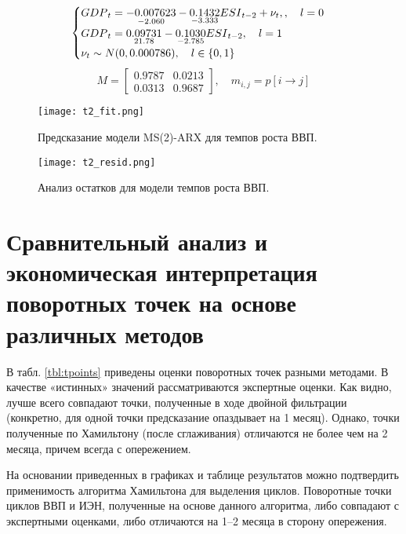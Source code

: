 \documentclass[../report.tex]{subfiles}
\begin{document}
	
	{
	\begin{equation}
		\label{eq:ms2varx}
		\begin{cases}
			{GDP}_{t} = 
				\underset{-2.060}{-0.007623} 
				- \underset{-3.333}{0.1432} {ESI}_{t-2}
				+ \nu_{t} , \space 
				, \quad l=0 \\
			{GDP}_{t} = 
				\underset{21.78}{0.09731}
				- \underset{-2.785}{0.1030} {ESI}_{t-2}
				, \quad l=1 \\
			\nu_{t} \sim N(0, 0.000786) , \quad l \in \{0, 1\}
		\end{cases}	
	\end{equation}
	\begin{equation}
		\label{eq:ms2varx_m}
		M = 
			\begin{bmatrix}
			0.9787 & 0.0213 \\
			0.0313 & 0.9687
			\end{bmatrix}
		, \quad m_{i,j} = p[i \rightarrow j]
	\end{equation}		
	}
		
	{
		\begin{figure}
			\texttt{[image: t2\_fit.png]}
			\caption{Предсказание модели MS(2)-ARX для темпов роста ВВП.}
			\label{fig:hp-fitcompare2}
		\end{figure}
		\begin{figure}
			\texttt{[image: t2\_resid.png]}
			\caption{Анализ остатков для модели темпов роста ВВП.}
			\label{fig:hp-residcompare2}
		\end{figure}
	}
	
	\section{Сравнительный анализ и экономическая интерпретация поворотных точек на основе различных методов }
	
	
	В табл. \ref{tbl:tpoints} приведены оценки поворотных точек разными методами. В качестве «истинных» значений рассматриваются экспертные оценки. Как видно, лучше всего совпадают точки, полученные в ходе двойной фильтрации (конкретно, для одной точки предсказание опаздывает на 1 месяц). Однако, точки полученные по Хамильтону (после сглаживания) отличаются не более чем на 2 месяца, причем всегда с опережением.
	
	На основании приведенных в графиках и таблице результатов можно подтвердить применимость алгоритма Хамильтона для выделения циклов. Поворотные точки циклов ВВП и ИЭН, полученные на основе данного алгоритма, либо совпадают с экспертными оценками, либо отличаются на 1–2 месяца в сторону опережения.
	
\end{document}
